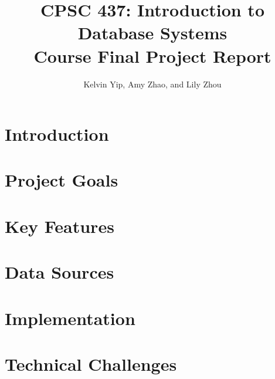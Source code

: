 \documentclass{article}
\title{CPSC 437: Introduction to Database Systems\\ Course Final Project Report}
\author{Kelvin Yip, Amy Zhao, and Lily Zhou}
\begin{document}
\maketitle

\section*{Introduction}

\section*{Project Goals}

\section*{Key Features}

\section*{Data Sources}

\section*{Implementation}

\section*{Technical Challenges}
\end{document}
